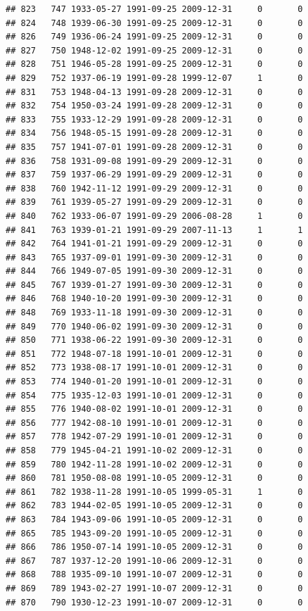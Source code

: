 \documentclass[
]{book}
\theoremstyle{definition}
\theoremstyle{definition}
\theoremstyle{definition}
\theoremstyle{definition}
\theoremstyle{remark}
\begin{document}
\begin{verbatim}
## 823   747 1933-05-27 1991-09-25 2009-12-31     0       0
## 824   748 1939-06-30 1991-09-25 2009-12-31     0       0
## 826   749 1936-06-24 1991-09-25 2009-12-31     0       0
## 827   750 1948-12-02 1991-09-25 2009-12-31     0       0
## 828   751 1946-05-28 1991-09-25 2009-12-31     0       0
## 829   752 1937-06-19 1991-09-28 1999-12-07     1       0
## 831   753 1948-04-13 1991-09-28 2009-12-31     0       0
## 832   754 1950-03-24 1991-09-28 2009-12-31     0       0
## 833   755 1933-12-29 1991-09-28 2009-12-31     0       0
## 834   756 1948-05-15 1991-09-28 2009-12-31     0       0
## 835   757 1941-07-01 1991-09-28 2009-12-31     0       0
## 836   758 1931-09-08 1991-09-29 2009-12-31     0       0
## 837   759 1937-06-29 1991-09-29 2009-12-31     0       0
## 838   760 1942-11-12 1991-09-29 2009-12-31     0       0
## 839   761 1939-05-27 1991-09-29 2009-12-31     0       0
## 840   762 1933-06-07 1991-09-29 2006-08-28     1       0
## 841   763 1939-01-21 1991-09-29 2007-11-13     1       1
## 842   764 1941-01-21 1991-09-29 2009-12-31     0       0
## 843   765 1937-09-01 1991-09-30 2009-12-31     0       0
## 844   766 1949-07-05 1991-09-30 2009-12-31     0       0
## 845   767 1939-01-27 1991-09-30 2009-12-31     0       0
## 846   768 1940-10-20 1991-09-30 2009-12-31     0       0
## 848   769 1933-11-18 1991-09-30 2009-12-31     0       0
## 849   770 1940-06-02 1991-09-30 2009-12-31     0       0
## 850   771 1938-06-22 1991-09-30 2009-12-31     0       0
## 851   772 1948-07-18 1991-10-01 2009-12-31     0       0
## 852   773 1938-08-17 1991-10-01 2009-12-31     0       0
## 853   774 1940-01-20 1991-10-01 2009-12-31     0       0
## 854   775 1935-12-03 1991-10-01 2009-12-31     0       0
## 855   776 1940-08-02 1991-10-01 2009-12-31     0       0
## 856   777 1942-08-10 1991-10-01 2009-12-31     0       0
## 857   778 1942-07-29 1991-10-01 2009-12-31     0       0
## 858   779 1945-04-21 1991-10-02 2009-12-31     0       0
## 859   780 1942-11-28 1991-10-02 2009-12-31     0       0
## 860   781 1950-08-08 1991-10-05 2009-12-31     0       0
## 861   782 1938-11-28 1991-10-05 1999-05-31     1       0
## 862   783 1944-02-05 1991-10-05 2009-12-31     0       0
## 863   784 1943-09-06 1991-10-05 2009-12-31     0       0
## 865   785 1943-09-20 1991-10-05 2009-12-31     0       0
## 866   786 1950-07-14 1991-10-05 2009-12-31     0       0
## 867   787 1937-12-20 1991-10-06 2009-12-31     0       0
## 868   788 1935-09-10 1991-10-07 2009-12-31     0       0
## 869   789 1943-02-27 1991-10-07 2009-12-31     0       0
## 870   790 1930-12-23 1991-10-07 2009-12-31     0       0

\end{verbatim}
\end{document}
